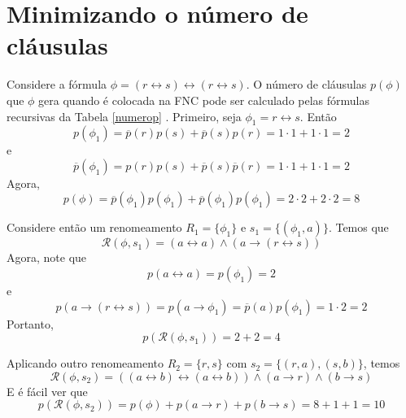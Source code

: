 \section{Minimizando o número de cláusulas}

\begin{example}
	\label{exemplo_minimizando}
	Considere a fórmula $\phi = (r \leftrightarrow s) \leftrightarrow (r \leftrightarrow s)$. O número de cláusulas $p(\phi)$ que $\phi$ gera quando é colocada na FNC pode ser calculado pelas fórmulas recursivas da Tabela \ref{numerop} \cite{de1992optimality}. Primeiro, seja $\phi_1 = r \leftrightarrow s$. Então $$p(\phi_1) = \overline{p}(r)p(s) + \overline{p}(s)p(r) = 1 \cdot 1 + 1 \cdot 1 = 2$$ e $$\overline{p}(\phi_1) = p(r)p(s) + \overline{p}(s)\overline{p}(r) = 1 \cdot 1 + 1 \cdot 1 = 2$$ Agora, $$p(\phi) = \overline{p}(\phi_1)p(\phi_1) + \overline{p}(\phi_1)p(\phi_1) = 2 \cdot 2 + 2 \cdot 2 = 8$$
	
	Considere então um renomeamento $R_1 = \{\phi_1 \}$ e $s_1 = \{(\phi_1,a) \}$. Temos que $$\mathcal{R}(\phi,s_1) = (a \leftrightarrow a) \wedge (a \rightarrow (r \leftrightarrow s))$$ Agora, note que $$p(a \leftrightarrow a) = p(\phi_1) = 2$$ e $$p(a \rightarrow (r \leftrightarrow s)) = p(a \rightarrow \phi_1) = \overline{p}(a)p(\phi_1) = 1 \cdot 2 = 2$$ Portanto, $$p(\mathcal{R}(\phi,s_1)) = 2 + 2 = 4$$
	
	Aplicando outro renomeamento $R_2 = \{r,s\}$ com $s_2 = \{(r,a),(s,b) \}$, temos $$\mathcal{R}(\phi,s_2) = ((a \leftrightarrow b) \leftrightarrow (a \leftrightarrow b)) \wedge (a \rightarrow r) \wedge (b \rightarrow s)$$ E é fácil ver que $$p(\mathcal{R}(\phi,s_2)) = p(\phi) + p(a \rightarrow r) + p(b \rightarrow s) = 8 + 1 + 1 = 10$$
\end{example}

